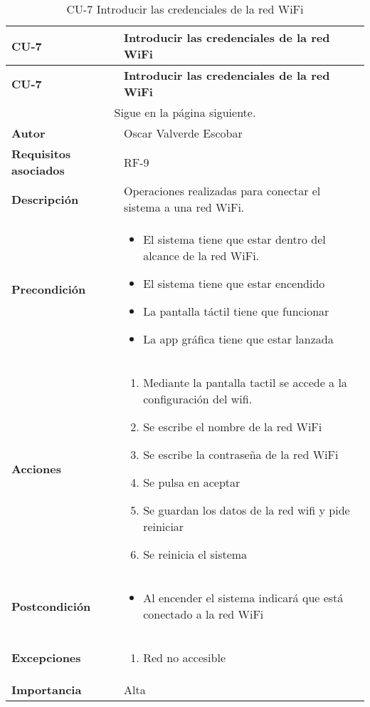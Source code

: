 \begin{longtable}{ p{} p{} }
    \caption{CU-7 Introducir las credenciales de la red WiFi}\\
    \hline
    \textbf{CU-7}    & \textbf{Introducir las credenciales de la red WiFi}\\
    \hline
    \endfirsthead
    \hline
    \textbf{CU-7}    & \textbf{Introducir las credenciales de la red WiFi}\\
    \hline
    \endhead
        \hline
        \multicolumn{2}{c}{Sigue en la página siguiente.}
        \endfoot
        \hline
        \endlastfoot
    \textbf{Versión}              & 1.0    \\
    \textbf{Autor}                & Oscar Valverde Escobar \\
    \textbf{Requisitos asociados} & RF-9\\
    \textbf{Descripción}          & Operaciones realizadas para conectar el sistema a una red WiFi.\\
    \textbf{Precondición}         & 
        \begin{itemize}
            \item El sistema tiene que estar dentro del alcance de la red WiFi.
            \item El sistema tiene que estar encendido
            \item La pantalla táctil tiene que funcionar
            \item La app gráfica tiene que estar lanzada
        \end{itemize}\\
    \textbf{Acciones}             &
    \begin{enumerate}
        \def\labelenumi{\arabic{enumi}.}
        \tightlist
        \item Mediante la pantalla tactil se accede a la configuración del wifi.
        \item Se escribe el nombre de la red WiFi
        \item Se escribe la contraseña de la red WiFi
        \item Se pulsa en aceptar
        \item Se guardan los datos de la red wifi y pide reiniciar
        \item Se reinicia el sistema
    \end{enumerate}\\
    \textbf{Postcondición}        &
    \begin{itemize}
            \item Al encender el sistema indicará que está conectado a la red WiFi
    \end{itemize}\\
    \textbf{Excepciones}          & 
        \begin{enumerate}
        \item Red no accesible
        \end{enumerate} \\
    \textbf{Importancia}          & Alta \\
    \hline
\end{longtable}

